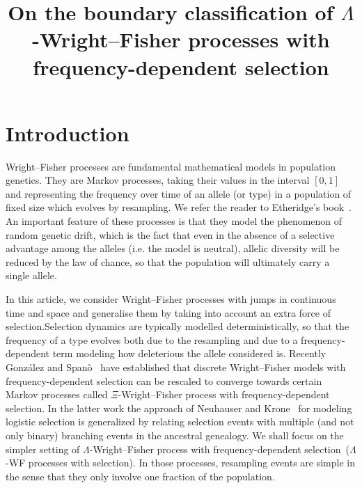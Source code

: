 \documentclass[AHL,Unicode,longabstracts,published]{cedram}
\title[$\Lambda$-Wright--Fisher processes with selection \& simple EFC processes]{On the boundary classification of $\Lambda$-Wright--Fisher processes with frequency-dependent selection}
\author[\initial{C.} \lastname{Foucart}]{\firstname{Clément} \lastname{Foucart}}
\author[\initial{X.} \lastname{Zhou}]{\firstname{Xiaowen} \lastname{Zhou}}
\begin{document}
\maketitle
\section{Introduction}
Wright--Fisher processes are fundamental mathematical models in population genetics. They are Markov processes, taking their values in the interval $[0,1]$ and representing the frequency over time of an allele (or type) in a population of fixed size which evolves by resampling. We refer the reader to Etheridge's book~\cite{etheridge2011}. An important feature of these processes is that they model the phenomenon of random genetic drift, which is the fact that even in the absence of a selective advantage among the alleles (i.e. the model is neutral), allelic diversity will be reduced by the law of chance, so that the population will ultimately carry a single allele.

In this article, we consider Wright--Fisher processes with jumps in continuous time and space and generalise them by taking into account an extra force of selection.\linebreak Selection dynamics are typically modelled deterministically, so that the frequency of a type evolves both due to the resampling and due to a frequency-dependent term modeling how deleterious the allele considered is. Recently González and Spanò~\cite{zbMATH06873684} have established that discrete Wright--Fisher models with frequency-dependent selection can be rescaled to converge towards certain Markov processes called $\Xi$-Wright--Fisher process with frequency-dependent selection. In the latter work the approach of Neuhauser and Krone~\cite{zbMATH01078990} for modeling logistic selection is generalized by relating selection events with multiple (and not only binary) branching events in the ancestral genealogy. We shall focus on the simpler setting of $\Lambda$-Wright--Fisher process with frequency-dependent selection~($\Lambda$-WF processes with selection). In those processes, resampling events are simple in the sense that they only involve one fraction of the population.
\end{document}
